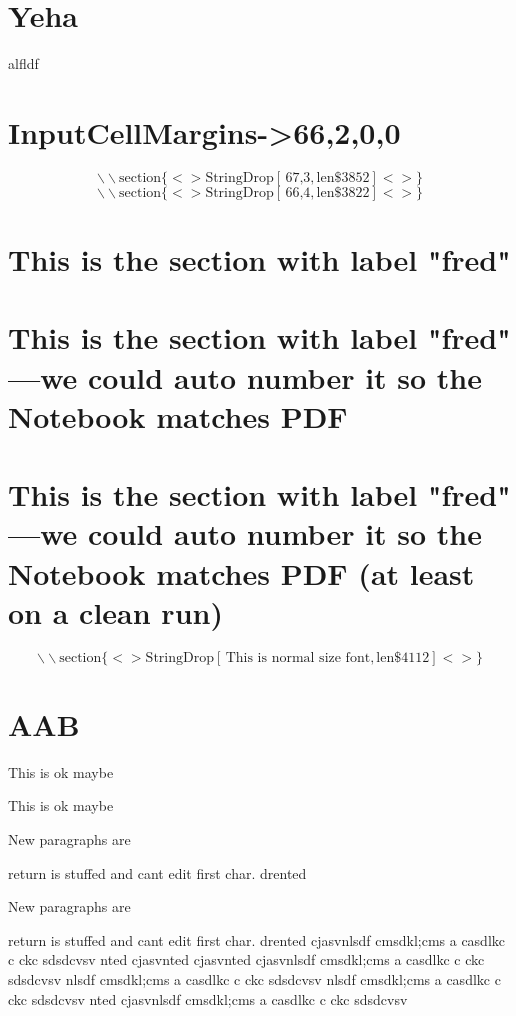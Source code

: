 \section{Yeha }

alfldf 

\section{InputCellMargins->{{66,2},{0,0}}}

$$
\text{$\backslash \backslash $section$\{$}<>\text{StringDrop}[\text{$\, $67,3},\text{len$\$$3852}]<>\}
$$
$$
\text{$\backslash \backslash $section$\{$}<>\text{StringDrop}[\text{$\, $66,4},\text{len$\$$3822}]<>\}
$$
\section{This is the section with label "fred" }
\label{fred}

\section{This is the section with label "fred" 
---we could auto number it so the Notebook matches PDF}
\label{fred}

\section{This is the section with label "fred" 
---we could auto number it so the Notebook matches PDF
(at least on a clean run)}
\label{fred}

$$
\text{$\backslash \backslash $section$\{$}<>\text{StringDrop}[\text{$\, $This is normal size font},\text{len$\$$4112}]<>\}
$$
\section{ AAB}



This is ok maybe 

This is ok maybe 

New paragraphs are

return is stuffed and cant edit first char.
drented 

New paragraphs are

return is stuffed and cant edit first char.
drented  cjasvnlsdf cmsdkl;cms a casdlkc c ckc sdsdcvsv nted  cjasvnted  cjasvnted  cjasvnlsdf cmsdkl;cms a casdlkc c ckc sdsdcvsv nlsdf cmsdkl;cms a casdlkc c ckc sdsdcvsv nlsdf cmsdkl;cms a casdlkc c ckc sdsdcvsv nted  cjasvnlsdf cmsdkl;cms a casdlkc c ckc sdsdcvsv 

